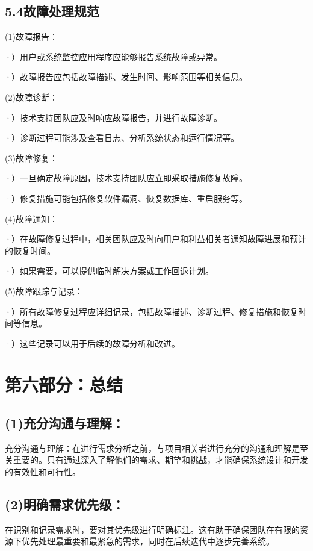 \documentclass[24pt,a4paper]{article}%
\begin{document}
\subsection*{\songti 5.4故障处理规范}
\noindent (1)故障报告：\par
·）用户或系统监控应用程序应能够报告系统故障或异常。\par
·）故障报告应包括故障描述、发生时间、影响范围等相关信息。\par
\noindent (2)故障诊断：\par
·）技术支持团队应及时响应故障报告，并进行故障诊断。\par
·）诊断过程可能涉及查看日志、分析系统状态和运行情况等。\par
\noindent (3)故障修复：\par
·）一旦确定故障原因，技术支持团队应立即采取措施修复故障。\par
·）修复措施可能包括修复软件漏洞、恢复数据库、重启服务等。\par
\noindent (4)故障通知：\par
·）在故障修复过程中，相关团队应及时向用户和利益相关者通知故障进展和预计的恢复时间。\par
·）如果需要，可以提供临时解决方案或工作回退计划。\par
\noindent (5)故障跟踪与记录：\par
·）所有故障修复过程应详细记录，包括故障描述、诊断过程、修复措施和恢复时间等信息。\par
·）这些记录可以用于后续的故障分析和改进。\par
\newpage

\section*{\songti 第六部分：总结}
\subsection*{\songti (1)充分沟通与理解：}
充分沟通与理解：在进行需求分析之前，与项目相关者进行充分的沟通和理解是至关重要的。只有通过深入了解他们的需求、期望和挑战，才能确保系统设计和开发的有效性和可行性。
\subsection*{\songti (2)明确需求优先级：}
在识别和记录需求时，要对其优先级进行明确标注。这有助于确保团队在有限的资源下优先处理最重要和最紧急的需求，同时在后续迭代中逐步完善系统。
\end{document}
